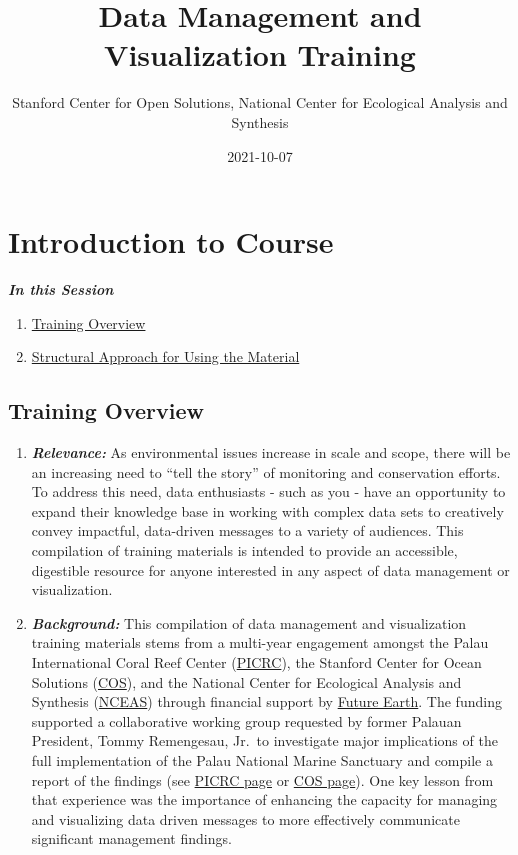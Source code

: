 \documentclass[
]{book}
\title{Data Management and Visualization Training}
\author{Stanford Center for Open Solutions, National Center for Ecological Analysis and Synthesis}
\date{2021-10-07}
\providecommand{\tightlist}{%
  \setlength{\itemsep}{0pt}\setlength{\parskip}{0pt}}
\begin{document}
\maketitle

{
\setcounter{tocdepth}{1}
\tableofcontents
}
\hypertarget{introduction-to-course}{%
\chapter{Introduction to Course}\label{introduction-to-course}}

\textbf{\emph{In this Session}}

\begin{enumerate}
\def\labelenumi{\arabic{enumi}.}
\tightlist
\item
  \protect\hyperlink{training-overview}{Training Overview}
\item
  \protect\hyperlink{how-to-use-these-materials}{Structural Approach for Using the Material}
\end{enumerate}

\hypertarget{training-overview}{%
\section{Training Overview}\label{training-overview}}

\begin{enumerate}
\def\labelenumi{\arabic{enumi}.}
\item
  \textbf{\emph{Relevance:}} As environmental issues increase in scale and scope, there will be an increasing need to ``tell the story'' of monitoring and conservation efforts. To address this need, data enthusiasts - such as you - have an opportunity to expand their knowledge base in working with complex data sets to creatively convey impactful, data-driven messages to a variety of audiences. This compilation of training materials is intended to provide an accessible, digestible resource for anyone interested in any aspect of data management or visualization.
\item
  \textbf{\emph{Background:}} This compilation of data management and visualization training materials stems from a multi-year engagement amongst the Palau International Coral Reef Center (\href{https://picrc.org/picrcpage/}{PICRC}), the Stanford Center for Ocean Solutions (\href{https://oceansolutions.stanford.edu/}{COS}), and the National Center for Ecological Analysis and Synthesis (\href{https://www.nceas.ucsb.edu/}{NCEAS}) through financial support by \href{https://futureearth.org/}{Future Earth}. The funding supported a collaborative working group requested by former Palauan President, Tommy Remengesau, Jr.~to investigate major implications of the full implementation of the Palau National Marine Sanctuary and compile a report of the findings (see \href{https://picrc.org/picrcpage/palau-national-marine-sanctuary/}{PICRC page} or \href{https://oceansolutions.stanford.edu/pnms-report}{COS page}). One key lesson from that experience was the importance of enhancing the capacity for managing and visualizing data driven messages to more effectively communicate significant management findings.
\end{enumerate}
\end{document}
